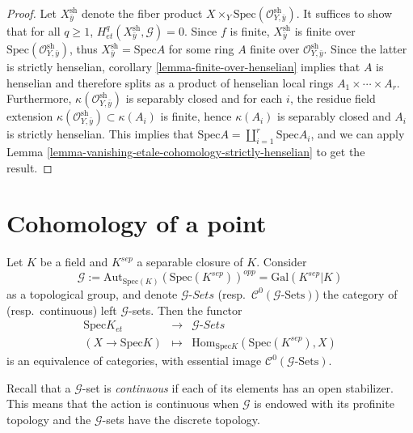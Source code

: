 \begin{proof}
Let $X_{\bar y}^\text{sh}$ denote the fiber product $X\times_Y
\text{Spec}(\mathcal{O}_{Y, \bar y}^\text{sh})$. It suffices to show that for
all $q\geq 1$, $H_{et}^q(X_{\bar y}^\text{sh}, \mathcal{G})=0$. Since $f$ is
finite, $X_{\bar y}^\text{sh}$ is finite over $\text{Spec}(\mathcal{O}_{Y, \bar
y}^\text{sh})$, thus $X_{\bar y}^\text{sh} = \text{Spec} A$ for some ring $A$
finite over $\mathcal{O}_{Y, \bar y}^\text{sh}$. Since the latter is strictly
henselian, corollary \ref{lemma-finite-over-henselian} implies that $A$
is henselian and therefore splits as a product of henselian local rings $A_1
\times \cdots \times A_r$. Furthermore, $\kappa(\mathcal{O}_{Y, \bar
y}^\text{sh})$ is separably closed and for each $i$, the residue field
extension $\kappa(\mathcal{O}_{Y, \bar y}^\text{sh}) \subset \kappa(A_i)$ is
finite, hence $\kappa(A_i)$ is separably closed and $A_i$ is strictly
henselian. This implies that $\text{Spec} A = \coprod_{i=1}^r \text{Spec} A_i$,
and we can apply
Lemma \ref{lemma-vanishing-etale-cohomology-strictly-henselian} to get
the result.
\end{proof}





\section{Cohomology of a point}
\label{section-cohomology-point}

\begin{lemma}
\label{lemma-sheaves-point}
Let $K$ be a field and $K^{sep}$ a separable closure of $K$. Consider
$$
\mathcal{G} := \text{Aut}_{\text{Spec}(K)}(\text{Spec}(K^{sep}))^{opp} =
\text{Gal}(K^{sep} | K)
$$
as a topological group, and denote $\mathcal{G}\textit{-Sets}$
(resp.\ $\mathcal{C}^0(\mathcal{G}\text{-Sets})$)
the category of (resp.\ continuous) left $\mathcal{G}$-sets.
Then the functor
$$
\begin{matrix}
\text{Spec} K _{et} & \longrightarrow & \mathcal{G}\textit{-Sets} \\
(X\to\text{Spec} K) & \longmapsto & \text{Hom}_{\text{Spec}
K}\left(\text{Spec}(K^{sep}), X\right)
\end{matrix}
$$
is an equivalence of categories, with essential image
$\mathcal{C}^0(\mathcal{G}\text{-Sets})$.
\end{lemma}

\noindent
Recall that a $\mathcal{G}$-set is {\it continuous} if each of its elements
has an open stabilizer. This means that the action is continuous when
$\mathcal{G}$ is endowed with its profinite topology and the $\mathcal{G}$-sets
have the discrete topology.

